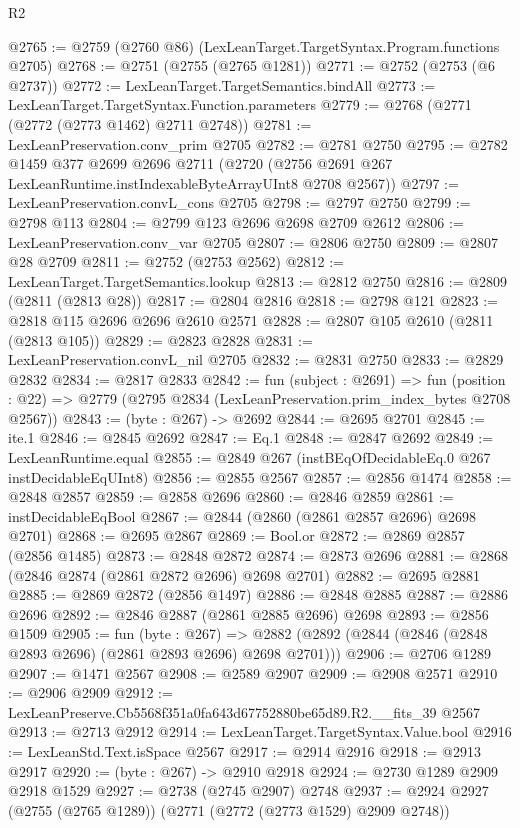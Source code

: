 \begin{lexlean}{R2}
\begin{coremodule}
@2765 := @2759 (@2760 @86) (LexLeanTarget.TargetSyntax.Program.functions @2705)
@2768 := @2751 (@2755 (@2765 @1281))
@2771 := @2752 (@2753 (@6 @2737))
@2772 := LexLeanTarget.TargetSemantics.bindAll
@2773 := LexLeanTarget.TargetSyntax.Function.parameters
@2779 := @2768 (@2771 (@2772 (@2773 @1462) @2711 @2748))
@2781 := LexLeanPreservation.conv_prim @2705
@2782 := @2781 @2750
@2795 := @2782
    @1459
    @377
    @2699
    @2696
    @2711
    (@2720 (@2756 @2691 @267 LexLeanRuntime.instIndexableByteArrayUInt8 @2708 @2567))
@2797 := LexLeanPreservation.convL_cons @2705
@2798 := @2797 @2750
@2799 := @2798 @113
@2804 := @2799 @123 @2696 @2698 @2709 @2612
@2806 := LexLeanPreservation.conv_var @2705
@2807 := @2806 @2750
@2809 := @2807 @28 @2709
@2811 := @2752 (@2753 @2562)
@2812 := LexLeanTarget.TargetSemantics.lookup
@2813 := @2812 @2750
@2816 := @2809 (@2811 (@2813 @28))
@2817 := @2804 @2816
@2818 := @2798 @121
@2823 := @2818 @115 @2696 @2696 @2610 @2571
@2828 := @2807 @105 @2610 (@2811 (@2813 @105))
@2829 := @2823 @2828
@2831 := LexLeanPreservation.convL_nil @2705
@2832 := @2831 @2750
@2833 := @2829 @2832
@2834 := @2817 @2833
@2842 := fun (subject : @2691) =>
  fun (position : @22) => @2779 (@2795 @2834 (LexLeanPreservation.prim_index_bytes @2708 @2567))
@2843 := (byte : @267) -> @2692
@2844 := @2695 @2701
@2845 := ite.{1}
@2846 := @2845 @2692
@2847 := Eq.{1}
@2848 := @2847 @2692
@2849 := LexLeanRuntime.equal
@2855 := @2849 @267 (instBEqOfDecidableEq.{0} @267 instDecidableEqUInt8)
@2856 := @2855 @2567
@2857 := @2856 @1474
@2858 := @2848 @2857
@2859 := @2858 @2696
@2860 := @2846 @2859
@2861 := instDecidableEqBool
@2867 := @2844 (@2860 (@2861 @2857 @2696) @2698 @2701)
@2868 := @2695 @2867
@2869 := Bool.or
@2872 := @2869 @2857 (@2856 @1485)
@2873 := @2848 @2872
@2874 := @2873 @2696
@2881 := @2868 (@2846 @2874 (@2861 @2872 @2696) @2698 @2701)
@2882 := @2695 @2881
@2885 := @2869 @2872 (@2856 @1497)
@2886 := @2848 @2885
@2887 := @2886 @2696
@2892 := @2846 @2887 (@2861 @2885 @2696) @2698
@2893 := @2856 @1509
@2905 := fun (byte : @267) =>
  @2882 (@2892 (@2844 (@2846 (@2848 @2893 @2696) (@2861 @2893 @2696) @2698 @2701)))
@2906 := @2706 @1289
@2907 := @1471 @2567
@2908 := @2589 @2907
@2909 := @2908 @2571
@2910 := @2906 @2909
@2912 := LexLeanPreserve.Cb5568f351a0fa643d67752880be65d89.R2.__fits_39 @2567
@2913 := @2713 @2912
@2914 := LexLeanTarget.TargetSyntax.Value.bool
@2916 := LexLeanStd.Text.isSpace @2567
@2917 := @2914 @2916
@2918 := @2913 @2917
@2920 := (byte : @267) -> @2910 @2918
@2924 := @2730 @1289 @2909 @2918 @1529
@2927 := @2738 (@2745 @2907) @2748
@2937 := @2924 @2927 (@2755 (@2765 @1289)) (@2771 (@2772 (@2773 @1529) @2909 @2748))

\end{coremodule}
\end{lexlean}

